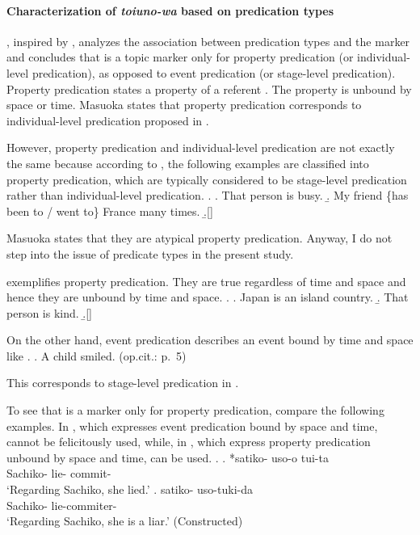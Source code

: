 \paragraph{Characterization of \textit{toiuno-wa} based on predication types}

, inspired by ,
analyzes the association between predication types and
the marker  and concludes that
 is a topic marker only for property predication (or individual-level predication),
as opposed to event predication (or stage-level predication).
Property predication states a property of a referent \cite{masuoka87,masuoka08}.
The property is unbound by space or time.
Masuoka states that property predication corresponds to
individual-level predication proposed in .%
 \footnotemark
 \footnotetext
 {
 However, property predication and individual-level predication are
 not exactly the same because
 according to ,
 the following examples are classified into property predication,
 which are typically considered to be stage-level predication rather than
 individual-level predication.
 \ex.
  \a. That person is busy.
  \b. My friend \{has been to / went to\} France many times.
  \b.[] \hfill{\cite[p.~5--6, translated by the current author]{masuoka08p}}
 
 Masuoka states that they are atypical property predication.
 Anyway, I do not step into the issue of predicate types in the present study.
 }
\Next exemplifies property predication.
They are true regardless of time and space and hence
they are unbound by time and space.
%
\ex.
 \a. Japan is an island country.
 \b. That person is kind.
 \b.[] \hfill{\cite[p.~4, translated by the current author]{masuoka08p}}

On the other hand,
event predication describes an event bound by time and space like \Next.
%
\ex. A child smiled.  \hfill{(op.cit.: p.~5)}

This corresponds to stage-level predication in .

To see that  is a marker only for property predication,
compare the following examples.
In \Next[a], which expresses event predication bound by space and time,
 cannot be felicitously used,
while, in \Next[b], which express property predication
unbound by space and time,
 can be used.
%
\ex.\label{ExSatiko}
\ag. *satiko- uso-o tui-ta \\
     Sachiko- lie- commit- \\
     `Regarding Sachiko, she lied.'
     \hfill{\cite[p.~96]{masuoka12}}
\bg. satiko- uso-tuki-da \\
     Sachiko- lie-commiter- \\
     `Regarding Sachiko, she is a liar.'
     \hfill{(Constructed)}


